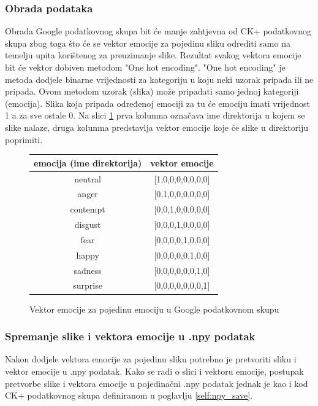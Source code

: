 \documentclass[times, utf8, zavrsni,numeric,pstricks]{fer}
\begin{document}
\subsubsection{Obrada podataka}
Obrada Google podatkovnog skupa bit će manje zahtjevna od CK+ podatkovnog skupa zbog toga što će se vektor emocije za pojedinu sliku odrediti samo na temelju upita korištenog za preuzimanje slike. Rezultat svakog vektora emocije bit će vektor dobiven metodom "One hot encoding". "One hot encoding" je metoda dodjele binarne vrijednosti za kategoriju u koju neki uzorak pripada ili ne pripada\cite{one_hot_encoding}. Ovom metodom uzorak (slika) može pripadati samo jednoj kategoriji (emocija). Slika koja pripada određenoj emociji za tu će emociju imati vrijednost 1 a za sve ostale 0. Na slici \ref{pic:google_emotion_emo_vector} prva kolumna označava ime direktorija u kojem se slike nalaze, druga kolumna predstavlja vektor emocije koje će slike u direktoriju poprimiti.

\begin{figure}[H]
\centering
\begin{tabular}{|c|c|} 
\hline
emocija (ime direktorija) & vektor emocije \\
\hline
neutral & [1,0,0,0,0,0,0,0] \\
anger	& [0,1,0,0,0,0,0,0] \\
contempt & [0,0,1,0,0,0,0,0] \\
disgust & [0,0,0,1,0,0,0,0]\\
fear  & [0,0,0,0,1,0,0,0]\\
happy & [0,0,0,0,0,1,0,0]\\
sadness & [0,0,0,0,0,0,1,0]\\
surprise & [0,0,0,0,0,0,0,1]\\
\hline
\end{tabular}
\caption{Vektor emocije za pojedinu emociju u Google podatkovnom skupu}
\label{pic:google_emotion_emo_vector}
\end{figure}

\subsubsection{Spremanje slike i vektora emocije u .npy podatak}
Nakon dodjele vektora emocije za pojedinu sliku potrebno je pretvoriti sliku i vektor emocije u .npy podatak. Kako se radi o slici i vektoru emocije, postupak pretvorbe slike i vektora emocije u pojedinačni .npy podatak jednak je kao i kod CK+ podatkovnog skupa definiranom u poglavlju \ref{self:npy_save}.
\end{document}
